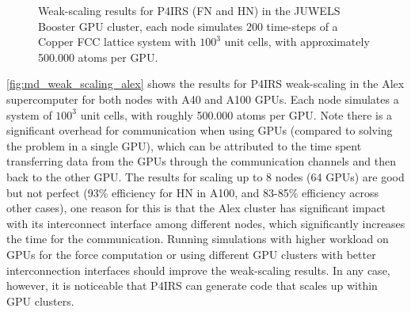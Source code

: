 \documentclass[preprint,12pt]{elsarticle}
\begin{document}
\begin{figure}[t]
\centering
{}
\vspace{-3ex}
\caption{Weak-scaling results for P4IRS (FN and HN) in the JUWELS Booster GPU cluster, each node simulates 200 time-steps of a Copper FCC lattice system with $100^3$ unit cells, with approximately 500.000 atoms per GPU.}
\vspace{-2ex}
\label{fig:md_weak_scaling_alex}
\end{figure}

\autoref{fig:md_weak_scaling_alex} shows the results for P4IRS weak-scaling in the Alex supercomputer for both nodes with A40 and A100 GPUs.
Each node simulates a system of $100^3$ unit cells, with roughly 500.000 atoms per GPU.
Note there is a significant overhead for communication when using GPUs (compared to solving the problem in a single GPU), which can be attributed to the time spent transferring data from the GPUs through the communication channels and then back to the other GPU.
The results for scaling up to 8 nodes (64 GPUs) are good but not perfect (93\% efficiency for \ac{HN} in A100, and 83-85\% efficiency across other cases), one reason for this is that the Alex cluster has significant impact with its interconnect interface among different nodes, which significantly increases the time for the communication.
Running simulations with higher workload on GPUs for the force computation or using different GPU clusters with better interconnection interfaces should improve the weak-scaling results.
In any case, however, it is noticeable that P4IRS can generate code that scales up within GPU clusters.
\end{document}
